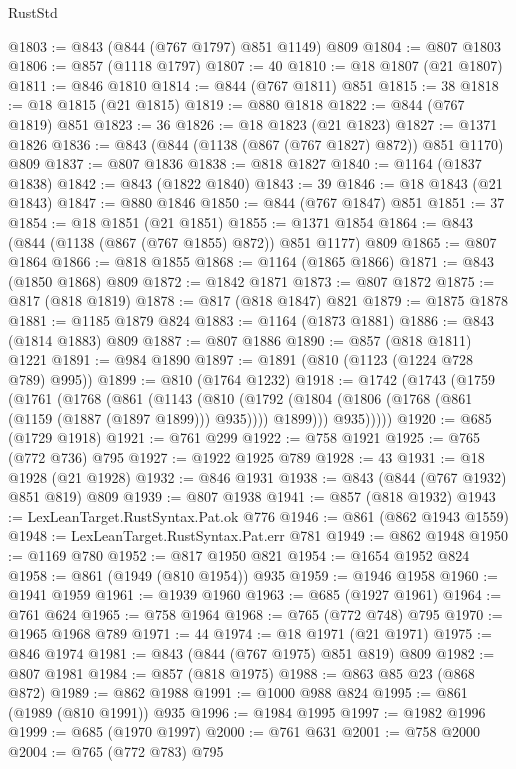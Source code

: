 \begin{lexlean}{RustStd}
\begin{coremodule}
@1803 := @843 (@844 (@767 @1797) @851 @1149) @809
@1804 := @807 @1803
@1806 := @857 (@1118 @1797)
@1807 := 40
@1810 := @18 @1807 (@21 @1807)
@1811 := @846 @1810
@1814 := @844 (@767 @1811) @851
@1815 := 38
@1818 := @18 @1815 (@21 @1815)
@1819 := @880 @1818
@1822 := @844 (@767 @1819) @851
@1823 := 36
@1826 := @18 @1823 (@21 @1823)
@1827 := @1371 @1826
@1836 := @843 (@844 (@1138 (@867 (@767 @1827) @872)) @851 @1170) @809
@1837 := @807 @1836
@1838 := @818 @1827
@1840 := @1164 (@1837 @1838)
@1842 := @843 (@1822 @1840)
@1843 := 39
@1846 := @18 @1843 (@21 @1843)
@1847 := @880 @1846
@1850 := @844 (@767 @1847) @851
@1851 := 37
@1854 := @18 @1851 (@21 @1851)
@1855 := @1371 @1854
@1864 := @843 (@844 (@1138 (@867 (@767 @1855) @872)) @851 @1177) @809
@1865 := @807 @1864
@1866 := @818 @1855
@1868 := @1164 (@1865 @1866)
@1871 := @843 (@1850 @1868) @809
@1872 := @1842 @1871
@1873 := @807 @1872
@1875 := @817 (@818 @1819)
@1878 := @817 (@818 @1847) @821
@1879 := @1875 @1878
@1881 := @1185 @1879 @824
@1883 := @1164 (@1873 @1881)
@1886 := @843 (@1814 @1883) @809
@1887 := @807 @1886
@1890 := @857 (@818 @1811) @1221
@1891 := @984 @1890
@1897 := @1891 (@810 (@1123 (@1224 @728 @789) @995))
@1899 := @810 (@1764 @1232)
@1918 := @1742
    (@1743
      (@1759
        (@1761
          (@1768
            (@861
              (@1143
                (@810
                  (@1792 (@1804 (@1806 (@1768 (@861 (@1159 (@1887 (@1897 @1899))) @935)))) @1899)))
              @935)))))
@1920 := @685 (@1729 @1918)
@1921 := @761 @299
@1922 := @758 @1921
@1925 := @765 (@772 @736) @795
@1927 := @1922 @1925 @789
@1928 := 43
@1931 := @18 @1928 (@21 @1928)
@1932 := @846 @1931
@1938 := @843 (@844 (@767 @1932) @851 @819) @809
@1939 := @807 @1938
@1941 := @857 (@818 @1932)
@1943 := LexLeanTarget.RustSyntax.Pat.ok @776
@1946 := @861 (@862 @1943 @1559)
@1948 := LexLeanTarget.RustSyntax.Pat.err @781
@1949 := @862 @1948
@1950 := @1169 @780
@1952 := @817 @1950 @821
@1954 := @1654 @1952 @824
@1958 := @861 (@1949 (@810 @1954)) @935
@1959 := @1946 @1958
@1960 := @1941 @1959
@1961 := @1939 @1960
@1963 := @685 (@1927 @1961)
@1964 := @761 @624
@1965 := @758 @1964
@1968 := @765 (@772 @748) @795
@1970 := @1965 @1968 @789
@1971 := 44
@1974 := @18 @1971 (@21 @1971)
@1975 := @846 @1974
@1981 := @843 (@844 (@767 @1975) @851 @819) @809
@1982 := @807 @1981
@1984 := @857 (@818 @1975)
@1988 := @863 @85 @23 (@868 @872)
@1989 := @862 @1988
@1991 := @1000 @988 @824
@1995 := @861 (@1989 (@810 @1991)) @935
@1996 := @1984 @1995
@1997 := @1982 @1996
@1999 := @685 (@1970 @1997)
@2000 := @761 @631
@2001 := @758 @2000
@2004 := @765 (@772 @783) @795

\end{coremodule}
\end{lexlean}
